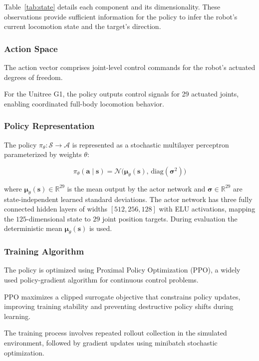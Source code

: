 \documentclass[pdflatex,sn-mathphys-num]{sn-jnl}%
\theoremstyle{thmstyleone}%
\theoremstyle{thmstyletwo}%
\theoremstyle{thmstylethree}%
\begin{document}
Table~\ref{tab:state} details each component and its dimensionality.
These observations provide sufficient information for the policy to infer the robot's current locomotion state and the target's direction.

\subsubsection{Action Space}
The action vector comprises joint-level control commands for the robot's actuated degrees of freedom.

For the Unitree G1, the policy outputs control signals for 29 actuated joints, enabling coordinated full-body locomotion behavior.

\subsubsection{Policy Representation}
The policy $\pi_\theta: \mathcal{S} \rightarrow \mathcal{A}$ is represented as a
stochastic multilayer perceptron parameterized by weights $\theta$:

\begin{equation}
\pi_\theta(\mathbf{a} \mid \mathbf{s}) =
\mathcal{N}\!\bigl(\boldsymbol{\mu}_\theta(\mathbf{s}),\,
\mathrm{diag}(\boldsymbol{\sigma}^2)\bigr)
\label{eq:policy}
\end{equation}

where $\boldsymbol{\mu}_\theta(\mathbf{s}) \in \mathbb{R}^{29}$ is the mean output
by the actor network and $\boldsymbol{\sigma} \in \mathbb{R}^{29}$ are state-independent
learned standard deviations.
The actor network has three fully connected hidden layers of widths $[512, 256, 128]$
with ELU activations, mapping the $125$-dimensional state to $29$ joint position targets.
During evaluation the deterministic mean $\boldsymbol{\mu}_\theta(\mathbf{s})$ is used.

\subsubsection{Training Algorithm}
The policy is optimized using Proximal Policy Optimization (PPO), a widely used policy-gradient algorithm for continuous control problems.

PPO maximizes a clipped surrogate objective that constrains policy updates, improving training stability and preventing destructive policy shifts during learning.

The training process involves repeated rollout collection in the simulated environment, followed by gradient updates using minibatch stochastic optimization.
\end{document}
